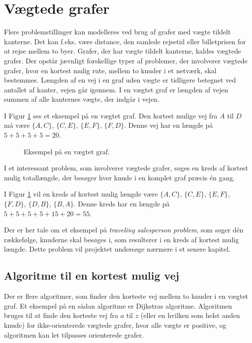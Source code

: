 \section{Vægtede grafer}

Flere problemstillinger kan modelleres ved brug af grafer med vægte tildelt kanterne. 
Det kan f.eks. være distance, den samlede rejsetid eller billetprisen for at rejse mellem to byer. 
Grafer, der har vægte tildelt kanterne, kaldes vægtede grafer. 
Der opstår jævnligt forskellige typer af problemer, der involverer vægtede grafer, hvor en kortest mulig rute, mellem to knuder i et netværk, skal bestemmes. 
Længden af en vej i en graf uden vægte er tidligere betegnet ved antallet af kanter, vejen går igennem.
I en vægtet graf er længden af vejen summen af alle kanternes vægte, der indgår i vejen. \\

\begin{exmp}
I Figur \ref{fig:weighted_graph} ses et eksempel på en vægtet graf. Den kortest mulige vej fra $A$ til $D$ må være $\lbrace A,C \rbrace$, $\lbrace C,E \rbrace$, $\lbrace E,F \rbrace$, $\lbrace F,D \rbrace$. Denne vej har en længde på $5+5+5+5=20$. 
\end{exmp}

\begin{figure}[h!]
	\centering
	
	\caption{Eksempel på en vægtet graf.} \label{fig:weighted_graph}
\end{figure}

I et interessant problem, som involverer vægtede grafer, søges en kreds af kortest mulig totallængde, der besøger hver knude i en komplet graf præcis én gang.

I Figur \ref{fig:weighted_graph} vil en kreds af kortest mulig længde være $\lbrace A,C \rbrace$, $\lbrace C,E \rbrace$, $\lbrace E,F \rbrace$, $\lbrace F,D \rbrace$, $\lbrace D,B \rbrace$, $\lbrace B,A \rbrace$.
Denne kreds har en længde på $5+5+5+5+15+20=55$.

Der er her tale om et eksempel på \emph{traveling salesperson problem}, som søger dén rækkefølge, knuderne skal besøges i, som resulterer i en kreds af kortest mulig længde. 
Dette problem vil projektet undersøge nærmere i et senere kapitel.

\subsection{Algoritme til en kortest mulig vej}
Der er flere algoritmer, som finder den korteste vej mellem to knuder i en vægtet graf.
Et eksempel på en sådan algoritme er Dijkstras algoritme.
Algoritmen bruges til at finde den korteste vej fra $a$ til $z$ (eller en hvilken som helst anden knude) for ikke-orienterede vægtede grafer, hvor alle vægte er positive, og algoritmen kan let tilpasses orienterede grafer.

